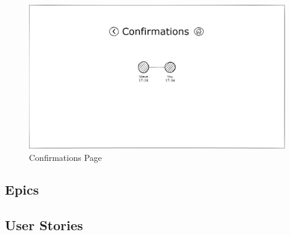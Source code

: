 \begin{figure}[H]
  \centering
  \includegraphics[width=0.9\linewidth]
  {05 design/assets/ui/confirmations page.png}
  \caption{Confirmations Page}
  \label{fig:confirmationsPage}
\end{figure}

\subsection{Epics} \label{ss:epics}



\subsection{User Stories} \label{ss:stories}

